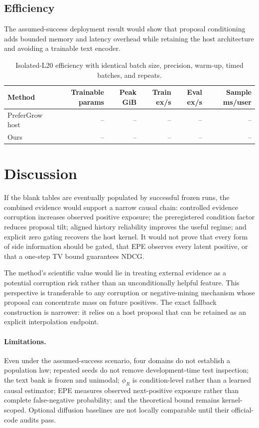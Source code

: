 \documentclass[letterpaper]{article}
\newcommand{\blankcell}{--}
\begin{document}
\subsection{Efficiency}
The assumed-success deployment result would show that proposal conditioning adds bounded memory and latency overhead while retaining the host architecture and avoiding a trainable text encoder.

\begin{table}[t]
\centering\small
\begin{tabular}{lrrrrr}
\toprule
Method & Trainable params & Peak GiB & Train ex/s & Eval ex/s & Sample ms/user\\
\midrule
PreferGrow host & \blankcell&\blankcell&\blankcell&\blankcell&\blankcell\\
Ours & \blankcell&\blankcell&\blankcell&\blankcell&\blankcell\\
\bottomrule
\end{tabular}
\caption{Isolated-L20 efficiency with identical batch size, precision, warm-up, timed batches, and repeats.}
\end{table}

\section{Discussion}
If the blank tables are eventually populated by successful frozen runs, the combined evidence would support a narrow causal chain: controlled evidence corruption increases observed positive exposure; the preregistered condition factor reduces proposal tilt; aligned history reliability improves the useful regime; and explicit zero gating recovers the host kernel. It would not prove that every form of side information should be gated, that EPE observes every latent positive, or that a one-step TV bound guarantees NDCG.

The method's scientific value would lie in treating external evidence as a potential corruption risk rather than an unconditionally helpful feature. This perspective is transferable to any corruption or negative-mining mechanism whose proposal can concentrate mass on future positives. The exact fallback construction is narrower: it relies on a host proposal that can be retained as an explicit interpolation endpoint.

\paragraph{Limitations.}
Even under the assumed-success scenario, four domains do not establish a population law; repeated seeds do not remove development-time test inspection; the text bank is frozen and unimodal; $\phi_R$ is condition-level rather than a learned causal estimator; EPE measures observed next-positive exposure rather than complete false-negative probability; and the theoretical bound remains kernel-scoped. Optional diffusion baselines are not locally comparable until their official-code audits pass.
\end{document}
